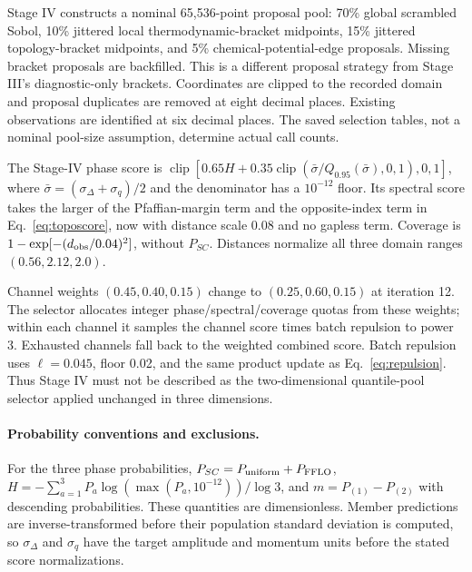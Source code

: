 Stage IV constructs a nominal 65,536-point proposal pool: 70\% global scrambled Sobol, 10\% jittered local thermodynamic-bracket midpoints, 15\% jittered topology-bracket midpoints, and 5\% chemical-potential-edge proposals. Missing bracket proposals are backfilled. This is a different proposal strategy from Stage III's diagnostic-only brackets. Coordinates are clipped to the recorded domain and proposal duplicates are removed at eight decimal places. Existing observations are identified at six decimal places. The saved selection tables, not a nominal pool-size assumption, determine actual call counts.

The Stage-IV phase score is $\operatorname{clip}[0.65H+0.35\operatorname{clip}(\bar\sigma/Q_{0.95}(\bar\sigma),0,1),0,1]$, where $\bar\sigma=(\sigma_\Delta+\sigma_q)/2$ and the denominator has a $10^{-12}$ floor. Its spectral score takes the larger of the Pfaffian-margin term and the opposite-index term in Eq.~\eqref{eq:toposcore}, now with distance scale 0.08 and no gapless term. Coverage is $1-\exp[-(d_{\rm obs}/0.04)^2]$, without $P_{SC}$. Distances normalize all three domain ranges $(0.56,2.12,2.0)$.

Channel weights $(0.45,0.40,0.15)$ change to $(0.25,0.60,0.15)$ at iteration 12. The selector allocates integer phase/spectral/coverage quotas from these weights; within each channel it samples the channel score times batch repulsion to power 3. Exhausted channels fall back to the weighted combined score. Batch repulsion uses $\ell=0.045$, floor 0.02, and the same product update as Eq.~\eqref{eq:repulsion}. Thus Stage IV must not be described as the two-dimensional quantile-pool selector applied unchanged in three dimensions.

\paragraph{Probability conventions and exclusions.}
For the three phase probabilities, $P_{SC}=P_{\rm uniform}+P_{\rm FFLO}$, $H=-\sum_{a=1}^{3}P_a\log(\max(P_a,10^{-12}))/\log 3$, and $m=P_{(1)}-P_{(2)}$ with descending probabilities. These quantities are dimensionless. Member predictions are inverse-transformed before their population standard deviation is computed, so $\sigma_\Delta$ and $\sigma_q$ have the target amplitude and momentum units before the stated score normalizations.

